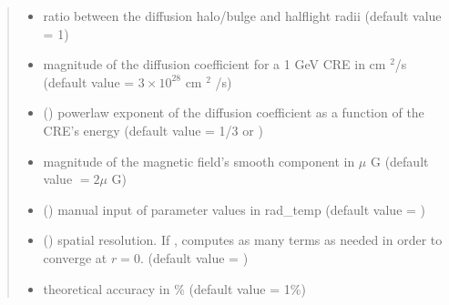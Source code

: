 \documentclass[letterpaper,10pt,english]{sphinxmanual}
\begin{document}
\begin{fulllineitems}
\begin{quote}
\begin{description}
\begin{itemize}
\item {} 
\sphinxAtStartPar
{} \textendash{} ratio between the diffusion halo/bulge and half\sphinxhyphen{}light radii (default value = 1)

\item {} 
\sphinxAtStartPar
{} \textendash{} magnitude of the diffusion coefficient for a 1 GeV CRE in cm \({}^2\)/s (default value = \(3\times 10^{28}\) cm \({}^2\) /s)

\item {} 
\sphinxAtStartPar
{} (\sphinxstyleliteralemphasis{\sphinxupquote{, }}) \textendash{} power\sphinxhyphen{}law exponent of the diffusion coefficient as a function of the CRE’s energy (default value = 1/3 or )

\item {} 
\sphinxAtStartPar
{} \textendash{} magnitude of the magnetic field’s smooth component in \(\mu\) G (default value \(= 2 \mu\) G)

\item {} 
\sphinxAtStartPar
{} () \textendash{} manual input of parameter values in rad\_temp (default value = )

\item {} 
\sphinxAtStartPar
{} () \textendash{} spatial resolution. If , {\hyperref[\detokenize{diffsph:diffsph.pyflux.synch_emissivity}]{}} computes as many terms as needed in order to converge at \(r=0\). (default value = )

\item {} 
\sphinxAtStartPar
{} \textendash{} theoretical accuracy in \% (default value = 1\%)

\end{itemize}


\end{description}
\end{quote}
\end{fulllineitems}
\end{document}
